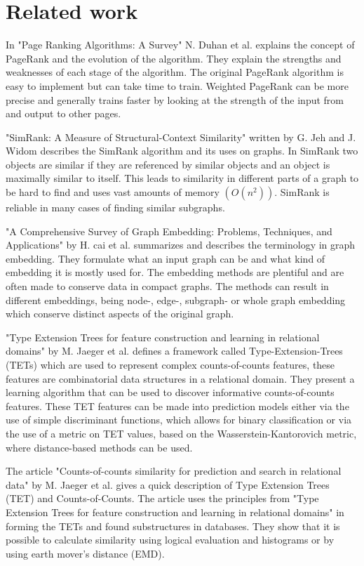 \section{Related work}
\label{Related_work}
In "Page Ranking Algorithms: A Survey" N. Duhan et al.\cite{4809246} explains the concept of PageRank and the evolution of the algorithm. They explain the strengths and weaknesses of each stage of the algorithm. The original PageRank algorithm is easy to implement but can take time to train. Weighted PageRank can be more precise and generally trains faster by looking at the strength of the input from and output to other pages. 

"SimRank: A Measure of Structural-Context Similarity" written by G. Jeh and J. Widom\cite{10.1145/775047.775126} describes the SimRank algorithm and its uses on graphs. In SimRank two objects are similar if they are referenced by similar objects and an object is maximally similar to itself. This leads to similarity in different parts of a graph to be hard to find and uses vast amounts of memory $(O(n^2))$. SimRank is reliable in many cases of finding similar subgraphs.

"A Comprehensive Survey of Graph Embedding: Problems, Techniques, and Applications" by H. cai et al.\cite{8294302} summarizes and describes the terminology in graph embedding. They formulate what an input graph can be and what kind of embedding it is mostly used for. The embedding methods are plentiful and are often made to conserve data in compact graphs. The methods can result in different embeddings, being node-, edge-, subgraph- or whole graph embedding which conserve distinct aspects of the original graph.

"Type Extension Trees for feature construction and learning in relational domains" by M. Jaeger et al. \cite{JAEGER201330} defines a framework called Type-Extension-Trees (TETs) which are used to represent complex counts-of-counts features, these features are combinatorial data structures in a relational domain. They present a learning algorithm that can be used to discover informative counts-of-counts features. These TET features can be made into prediction models either via the use of simple discriminant functions, which allows for binary classification or via the use of a metric on TET values, based on the Wasserstein-Kantorovich metric, where distance-based methods can be used.

The article "Counts-of-counts similarity for prediction and search in relational data" by M. Jaeger et al.\cite{jaeger2019counts} gives a quick description of Type Extension Trees (TET) and Counts-of-Counts. The article uses the principles from "Type Extension Trees for feature construction and learning in relational domains" in forming the TETs and found substructures in databases. They show that it is possible to calculate similarity using logical evaluation and histograms or by using earth mover's distance (EMD).

